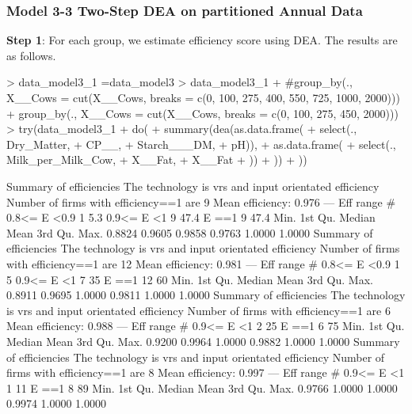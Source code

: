 \documentclass[12pt,]{article}
\begin{document}
\subsubsection{Model 3-3 Two-Step DEA on partitioned Annual Data}

\textbf{Step 1}: For each group, we estimate efficiency score using DEA. The results are as follows.
\begin{Schunk}
\begin{Sinput}
> data_model3_1 =data_model3
> data_model3_1%<>%
+   #group_by(., X__Cows = cut(X__Cows, breaks = c(0, 100, 275, 400, 550, 725, 1000, 2000)))
+     group_by(., X__Cows = cut(X__Cows, breaks = c(0, 100, 275, 450, 2000)))
> try(data_model3_1%>%
+   do({
+    summary(dea(as.data.frame(
+                   select(., Dry_Matter, 
+                   CP__, 
+                   Starch___DM, 
+                   pH)), 
+                as.data.frame(
+                  select(., Milk_per_Milk_Cow,
+                         X__Fat,
+                         X__Fat
+                    ))
+                  ))
+   }))
\end{Sinput}
\begin{Soutput}
Summary of efficiencies
The technology is vrs and input orientated efficiency
Number of firms with efficiency==1 are 9 
Mean efficiency: 0.976 
---                
  Eff range      #    %
  0.8<= E <0.9   1  5.3
  0.9<= E <1     9 47.4
        E ==1    9 47.4
   Min. 1st Qu.  Median    Mean 3rd Qu.    Max. 
 0.8824  0.9605  0.9858  0.9763  1.0000  1.0000 
Summary of efficiencies
The technology is vrs and input orientated efficiency
Number of firms with efficiency==1 are 12 
Mean efficiency: 0.981 
---                
  Eff range       #  %
  0.8<= E <0.9    1  5
  0.9<= E <1      7 35
        E ==1    12 60
   Min. 1st Qu.  Median    Mean 3rd Qu.    Max. 
 0.8911  0.9695  1.0000  0.9811  1.0000  1.0000 
Summary of efficiencies
The technology is vrs and input orientated efficiency
Number of firms with efficiency==1 are 6 
Mean efficiency: 0.988 
---                
  Eff range      #  %
  0.9<= E <1     2 25
        E ==1    6 75
   Min. 1st Qu.  Median    Mean 3rd Qu.    Max. 
 0.9200  0.9964  1.0000  0.9882  1.0000  1.0000 
Summary of efficiencies
The technology is vrs and input orientated efficiency
Number of firms with efficiency==1 are 8 
Mean efficiency: 0.997 
---                
  Eff range      #  %
  0.9<= E <1     1 11
        E ==1    8 89
   Min. 1st Qu.  Median    Mean 3rd Qu.    Max. 
 0.9766  1.0000  1.0000  0.9974  1.0000  1.0000 
\end{Soutput}
\end{Schunk}
\end{document}
